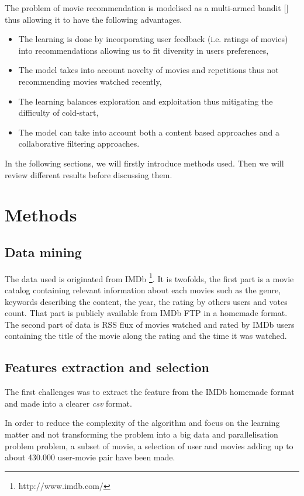 \documentclass[letterpaper]{article}
\begin{document}
The problem of movie recommendation is modelised as a multi-armed bandit [\cite{sutton1998reinforcement}] thus allowing it to have the following advantages. 

\begin{itemize}
	\item The learning is done by incorporating user feedback (i.e. ratings of movies) into recommendations allowing us to fit diversity in users preferences,
	\item The model takes into account novelty of movies and repetitions thus not recommending movies watched recently,
	\item The learning balances exploration and exploitation thus mitigating the difficulty of cold-start,
	\item The model can take into account both a content based approaches and a collaborative filtering approaches.
\end{itemize}


In the following sections, we will firstly introduce methods used. Then we will review different results before discussing them.

\section{Methods}

\subsection{Data mining}

The data used is originated from IMDb \footnote{http://www.imdb.com/}. It is twofolds, the first part is a movie catalog containing relevant information about each movies such as the genre, keywords describing the content, the year, the rating by others users and votes count. That part is publicly available from IMDb FTP in a homemade format. The second part of data is RSS flux of movies watched and rated by IMDb users containing the title of the movie along the rating and the time it was watched.

\subsection{Features extraction and selection}

The first challenges was to extract the feature from the IMDb homemade format and made into a clearer \textit{csv} format.

In order to reduce the complexity of the algorithm and focus on the learning matter and not transforming the problem into a big data and parallelisation problem problem, a subset of movie, a selection of user and movies adding up to about 430.000 user-movie pair have been made.
\end{document}
